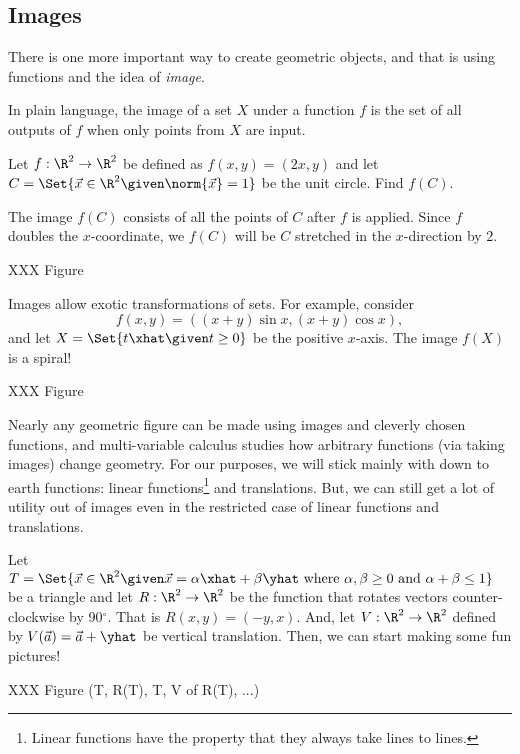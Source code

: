 \subsection{Images}

There is one more important way to create geometric objects, and that is using functions
and the idea of \emph{image}.

\DefImage

In plain language, the image of a set $X$ under a function $f$ is the set
of all outputs of $f$ when only points from $X$ are input.

\begin{example}
	Let $f:\R^2\to\R^2$ be defined as $f(x,y)=(2x,y)$ and let $C=\Set{\vec x\in\R^2\given
	\norm{\vec x}=1}$ be the unit circle. Find $f(C)$.

	The image $f(C)$ consists of all the points of $C$ after $f$ is applied.
	Since $f$ doubles the $x$-coordinate, we $f(C)$ will be $C$ stretched in the $x$-direction
	by $2$.

	XXX Figure
\end{example}

Images allow exotic transformations of sets. For example, consider \[f(x,y)=((x+y)\sin x, (x+y)\cos x),\]
and let $X=\Set{t\xhat\given t\geq 0}$ be the positive $x$-axis. The image $f(X)$ is a spiral!

XXX Figure

Nearly any geometric figure can be made using images and cleverly chosen functions, and multi-variable
calculus studies how arbitrary functions (via taking images) change geometry. For our purposes, we will
stick mainly with down to earth functions: linear functions\footnote{ Linear functions
have the property that they always take lines to lines.} and translations. But, we can still get a 
lot of utility out of images even in the restricted case of linear functions and translations.

Let $T=\Set{\vec x\in\R^2\given \vec x=\alpha\xhat+\beta\yhat\text{ where } \alpha,\beta\geq 0\text{ and }
\alpha+\beta \leq 1}$ be a triangle and let $R:\R^2\to\R^2$ be the function that rotates vectors 
counter-clockwise by 90$^\circ$. That is $R(x,y)=(-y,x)$. And, let $V:\R^2\to\R^2$ defined by $V(\vec a)=
\vec a+\yhat$ be vertical translation. Then, we can start making some fun pictures!

XXX Figure ({T, R(T)}, {T, V of R(T)}, ...)



